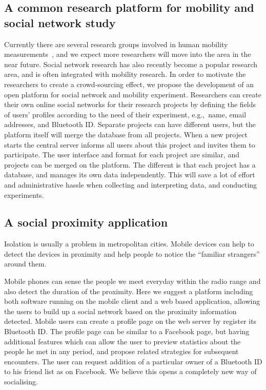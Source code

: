 \documentclass{sig-alternate-10pt}
\begin{document}
\subsection{A common research platform for mobility and social network study}
\vspace{-1mm}
Currently there are several research groups involved in human
mobility
measurements~\cite{psn-tmc07,rhee:levymobility,Karagiannis07mobile,Vikram06Mobicom,bigwood08Wimob},
and we expect more researchers will move into the area in the near
future. Social network research has also recently become a popular
research area, and is often integrated with mobility
research. In order to motivate the researchers to create a
crowd-sourcing effect, we propose the development of an open platform for
social network and mobility experiment. Researchers can create their
own online social networks for their research projects by defining the
fields of users' profiles according to the need of their experiment,
e.g.,~name, email addresses, and Bluetooth ID. Separate projects can
have different users, but the platform itself will merge the database
from all projects.  When a new project starts the central server
informs all users about this project and invites them to
participate. The user interface and format for each project are
similar, and projects can be merged on the platform. The different is
that each project has a database, and manages its own data
independently. This will save a lot of effort and administrative
hassle when collecting and interpreting data, and conducting
experiments.
\vspace{-1mm}
\subsection{A social proximity application}
\vspace{-1mm}
Isolation is usually a problem in metropolitan cities. Mobile devices
can help to detect the devices in proximity and help people to notice
the ``familiar strangers'' around them.

Mobile phones can sense the people we meet everyday within the radio
range and also detect the duration of the proximity. Here we suggest a
platform including both software running on the mobile client and a
web based application, allowing the users to build up a social network
based on the proximity information detected. Mobile users can create a
profile page on the web server by register its Bluetooth ID.  The
profile page can be similar to a Facebook page, but having additional
features which can allow the user to preview statistics about the
people he met in any period, and propose related strategies for
subsequent encounters. The user can request addition of a particular
owner of a Bluetooth ID to his friend list as on Facebook. We believe
this opens a completely new way of socialising.
\end{document}
